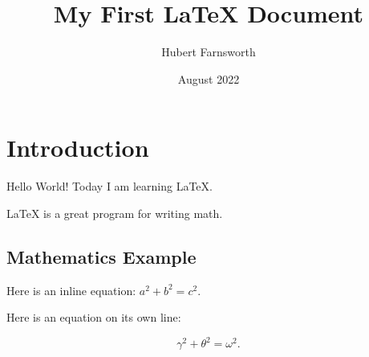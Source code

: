 \documentclass{article}
\title{My First LaTeX Document}
\author{Hubert Farnsworth}
\date{August 2022}
\begin{document}
\maketitle

\section{Introduction}

Hello World! Today I am learning \LaTeX.

\LaTeX{} is a great program for writing math. 



\subsection{Mathematics Example}

Here is an inline equation: $a^2+b^2=c^2$.



Here is an equation on its own line:

\begin{equation}

\gamma^2+\theta^2=\omega^2.

\end{equation}
\end{document}

